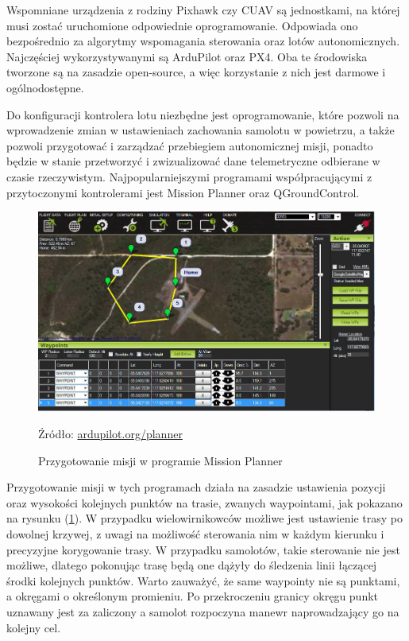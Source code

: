 \documentclass[12pt, a4paper]{article}
\let\oldref\ref
\renewcommand{\ref}[1]{(\oldref{#1})}
\begin{document}
Wspomniane urządzenia z rodziny Pixhawk czy CUAV są jednostkami, na której musi zostać uruchomione odpowiednie oprogramowanie. Odpowiada ono bezpośrednio za algorytmy wspomagania sterowania oraz lotów autonomicznych. Najczęściej wykorzystywanymi są ArduPilot oraz PX4. Oba te środowiska tworzone są na zasadzie open-source, a więc korzystanie z nich jest darmowe i ogólnodostępne. 

Do konfiguracji kontrolera lotu niezbędne jest oprogramowanie, które pozwoli na wprowadzenie zmian w ustawieniach zachowania samolotu w powietrzu, a także pozwoli przygotować i zarządzać przebiegiem autonomicznej misji, ponadto będzie w stanie przetworzyć i zwizualizować dane telemetryczne odbierane w czasie rzeczywistym. Najpopularniejszymi programami współpracującymi z przytoczonymi kontrolerami jest Mission Planner oraz QGroundControl.

\begin{figure}[ht]
    \centering
    \includegraphics[width=1\textwidth]{missionplanner}
    \caption{Przygotowanie misji w programie Mission Planner}
    \small Źródło: \url{ardupilot.org/planner}
    \label{fig:missionplanner}
\end{figure}

Przygotowanie misji w tych programach działa na zasadzie ustawienia pozycji oraz wysokości kolejnych punktów na trasie, zwanych waypointami, jak pokazano na rysunku \ref{fig:missionplanner}. W przypadku wielowirnikowców możliwe jest ustawienie trasy po dowolnej krzywej, z uwagi na możliwość sterowania nim w każdym kierunku i precyzyjne korygowanie trasy. W przypadku samolotów, takie sterowanie nie jest możliwe, dlatego pokonując trasę będą one dążyły do śledzenia linii łączącej środki kolejnych punktów. Warto zauważyć, że same waypointy nie są punktami, a okręgami o określonym promieniu. Po przekroczeniu granicy okręgu punkt uznawany jest za zaliczony a samolot rozpoczyna manewr naprowadzający go na kolejny cel.
\end{document}
